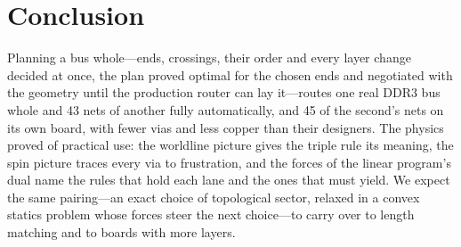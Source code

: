 \documentclass[journal]{IEEEtran}
\begin{document}
\section{Conclusion}
Planning a bus whole---ends, crossings, their order and every layer change decided at once, the plan proved optimal for the chosen ends and negotiated with the geometry until the production router can lay it---routes one real DDR3 bus whole and 43 nets of another fully automatically, and 45 of the second's nets on its own board, with fewer vias and less copper than their designers. The physics proved of practical use: the worldline picture gives the triple rule its meaning, the spin picture traces every via to frustration, and the forces of the linear program's dual name the rules that hold each lane and the ones that must yield. We expect the same pairing---an exact choice of topological sector, relaxed in a convex statics problem whose forces steer the next choice---to carry over to length matching and to boards with more layers.



\end{document}
